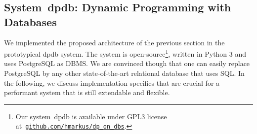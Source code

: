 \documentclass{llncs}
\newcommand{\dpdb}{{\small\textsf{dpdb}}\xspace}
\begin{document}
%
%

\subsection{System~\dpdb: Dynamic Programming with Databases}

We implemented the proposed architecture of the previous section in the prototypical \dpdb system.
The system is open-source\footnote{Our system~\dpdb is available under GPL3 license
    at~\href{https://github.com/hmarkus/dp_on_dbs/releases/tag/TODOv1.001-pre}{\nolinkurl{github.com/hmarkus/dp_on_dbs}}.}, written in Python 3 and uses PostgreSQL as DBMS.
We are convinced though that one can easily replace PostgreSQL by any other state-of-the-art relational database that uses SQL.
%
%
In the following, we discuss implementation specifics that are crucial for a performant system that is still extendable and flexible.
\end{document}
